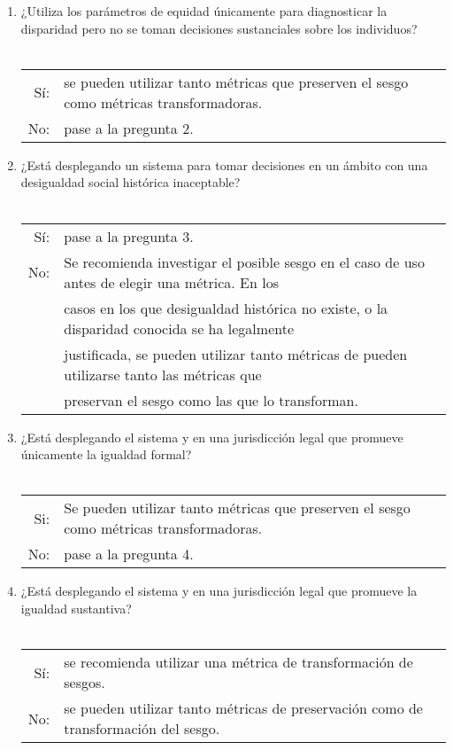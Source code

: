 \begin{enumerate}[P1]
    \item ¿Utiliza los parámetros de equidad únicamente para diagnosticar la disparidad pero no se toman decisiones sustanciales sobre los individuos?\\\\
	\begin{tabular}{rl}
	    Sí:& se pueden utilizar tanto métricas que preserven el sesgo como métricas transformadoras.\\
	    No:& pase a la pregunta 2.
	\end{tabular}
    \item ¿Está desplegando un sistema para tomar decisiones en un ámbito con una desigualdad social histórica inaceptable?\\\\
	\begin{tabular}{rl}
	    Sí:& pase a la pregunta 3.\\
	    No:& Se recomienda investigar el posible sesgo en el caso de uso antes de elegir una métrica. En los \\
	       & casos en los que desigualdad histórica no existe, o la disparidad conocida se ha legalmente \\
	       & justificada, se pueden utilizar tanto métricas de pueden utilizarse tanto las métricas que \\
	       & preservan el sesgo como las que lo transforman.
	\end{tabular}
    \item ¿Está desplegando el sistema y en una jurisdicción legal que promueve únicamente la igualdad formal?\\\\
	\begin{tabular}{rl}
	    Si: & Se pueden utilizar tanto métricas que preserven el sesgo como métricas transformadoras.\\
	    No: & pase a la pregunta 4.
	\end{tabular}
	\item ¿Está desplegando el sistema y en una jurisdicción legal que promueve la igualdad sustantiva?\\\\
	    \begin{tabular}{rl}
		Sí: & se recomienda utilizar una métrica de transformación de sesgos.\\
		No: & se pueden utilizar tanto métricas de preservación como de transformación del sesgo.
	    \end{tabular}
\end{enumerate}

